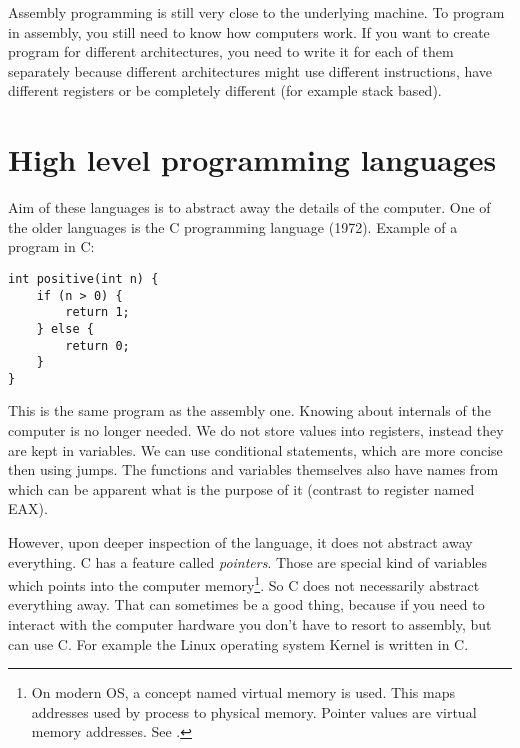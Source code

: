 Assembly programming is still very close to the underlying machine. To program in assembly, you still need to know
how computers work. If you want to create program for different architectures, you need to write it for each of them
separately because different architectures might use different instructions, have different registers or be completely 
different (for example stack based).

\section{High level programming languages}
Aim of these languages is to abstract away the details of the computer. One of the older languages is the C programming language (1972).
Example of a program in C:
\begin{verbatim}
int positive(int n) {
    if (n > 0) {
        return 1;
    } else {
        return 0;
    }
}
\end{verbatim}
This is the same program as the assembly one. Knowing about internals of the computer is no longer needed.
We do not store values into registers, instead they are kept in variables. We can use conditional statements,
which are more concise then using jumps. The functions and variables themselves also have names from which
can be apparent what is the purpose of it (contrast to register named EAX).

However, upon deeper inspection of the language, it does not abstract away everything. C has a feature called
\textit{pointers}. Those are special kind of variables which points into the computer memory\footnote{On modern OS,
a concept named virtual memory is used. This maps addresses used by process to physical memory. Pointer values are virtual memory addresses. See \cite{modern-os}.}.
So C does not necessarily abstract everything away. That can sometimes be a good thing, because if you need to 
interact with the computer hardware you don't have to resort to assembly, but can use C. For example the Linux
operating system Kernel is written in C.

